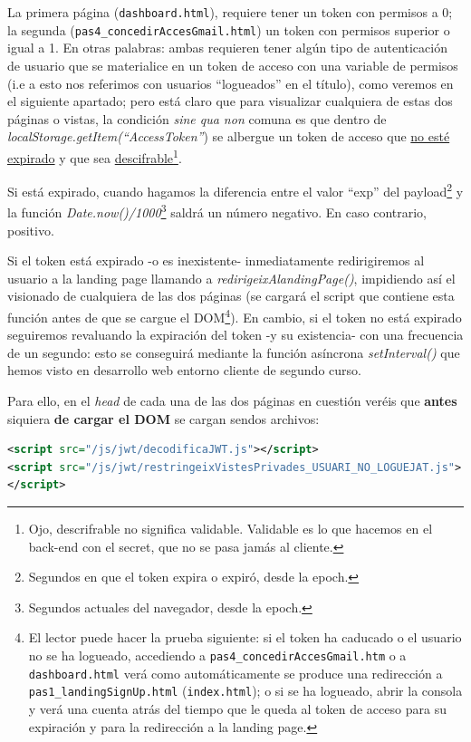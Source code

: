 \documentclass[a4paper,12pt]{report}
\begin{document}
	La primera página (\texttt{dashboard.html}), requiere tener un token con permisos a 0; la segunda (\texttt{pas4\_concedirAccesGmail.html}) un token con permisos superior o igual a 1. En otras palabras: ambas requieren tener algún tipo de autenticación de usuario que se materialice en un token de acceso con una variable de permisos (i.e a esto nos referimos con usuarios ``logueados'' en el título), como veremos en el siguiente apartado; pero está claro que para visualizar cualquiera de estas dos páginas o vistas, la condición \textit{sine qua non} comuna es que dentro de \textit{localStorage.getItem(``AccessToken''}) se albergue un token de acceso que \underline{no esté expirado} y que sea \underline{descifrable}\footnote{Ojo, descrifrable no significa validable. Validable es lo que hacemos en el back-end con el secret, que no se pasa jamás al cliente.}.
	
	Si está expirado, cuando hagamos la diferencia entre el valor ``exp'' del payload\footnote{Segundos en que el token expira o expiró, desde la epoch.} y la función \textit{Date.now()/1000}\footnote{Segundos actuales del navegador, desde la epoch.} saldrá un número negativo. En caso contrario, positivo. 
	
	Si el token está expirado -o es inexistente- inmediatamente redirigiremos al usuario a la landing page llamando a \textit{redirigeixAlandingPage()}, impidiendo así el visionado de cualquiera de las dos páginas (se cargará el script que contiene esta función antes de que se cargue el DOM\footnote{El lector puede hacer la prueba siguiente: si el token ha caducado o el usuario no se ha logueado, accediendo a \texttt{pas4\_concedirAccesGmail.htm} o a \texttt{dashboard.html} verá como automáticamente se produce una redirección a \texttt{pas1\_landingSignUp.html} (\texttt{index.html}); o si se ha logueado, abrir la consola y verá una cuenta atrás del tiempo que le queda al token de acceso para su expiración y para la redirección a la landing page.}). En cambio, si el token no está expirado seguiremos revaluando la expiración del token -y su existencia- con una frecuencia de un segundo: esto se conseguirá mediante la función asíncrona \textit{setInterval()} que hemos visto en desarrollo web entorno cliente de segundo curso.
	
	Para ello, en el \textit{head} de cada una de las dos páginas en cuestión veréis que \textbf{antes} siquiera \textbf{de cargar el DOM} se cargan sendos archivos:
	
\begin{lstlisting}[language=xml, basicstyle=\ttfamily\footnotesize, keywordstyle=\color{magenta}]
<script src="/js/jwt/decodificaJWT.js"></script>
<script src="/js/jwt/restringeixVistesPrivades_USUARI_NO_LOGUEJAT.js">
</script>
\end{lstlisting}
\end{document}
